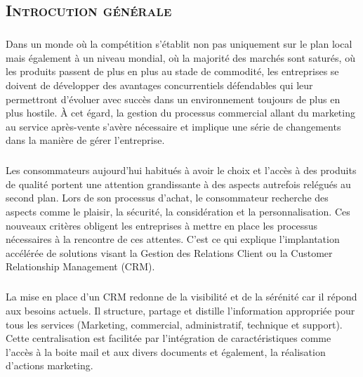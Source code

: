 \documentclass[a4paper, 12pt]{report}
\begin{document}
\begin{flushleft}
\chapter*{\textsc{Introcution générale}}

 \paragraph{}
Dans un monde où la compétition s'établit non pas uniquement sur le plan local mais également à un niveau mondial, où la majorité des marchés sont saturés, où les produits passent de plus en plus au stade de commodité, les entreprises se doivent de développer des avantages concurrentiels défendables qui leur permettront d'évoluer avec succès dans un environnement toujours de plus en plus hostile. À cet égard, la gestion du processus commercial allant du marketing au service après-vente s'avère nécessaire et implique une série de changements dans la manière de gérer l'entreprise.

 \paragraph{}
Les consommateurs aujourd'hui habitués à avoir le choix et l'accès à des produits de qualité portent une attention grandissante à des aspects autrefois relégués au second plan. Lors de son processus d'achat, le consommateur recherche des aspects comme le plaisir, la sécurité, la considération et la personnalisation. Ces nouveaux critères obligent les entreprises à mettre en place les processus nécessaires à la rencontre de ces attentes. C'est ce qui explique l'implantation accélérée de solutions visant la Gestion des Relations Client ou la Customer Relationship Management (CRM). 

 \paragraph{}
La mise en place d'un CRM redonne de la visibilité et de la sérénité car il répond aux besoins actuels. Il structure, partage et distille l'information appropriée pour tous les services (Marketing, commercial, administratif, technique et support). Cette centralisation est facilitée par l'intégration de caractéristiques comme l'accès à la boite mail et aux divers documents et également, la réalisation d'actions marketing. 
  


\end{flushleft}
\end{document}
